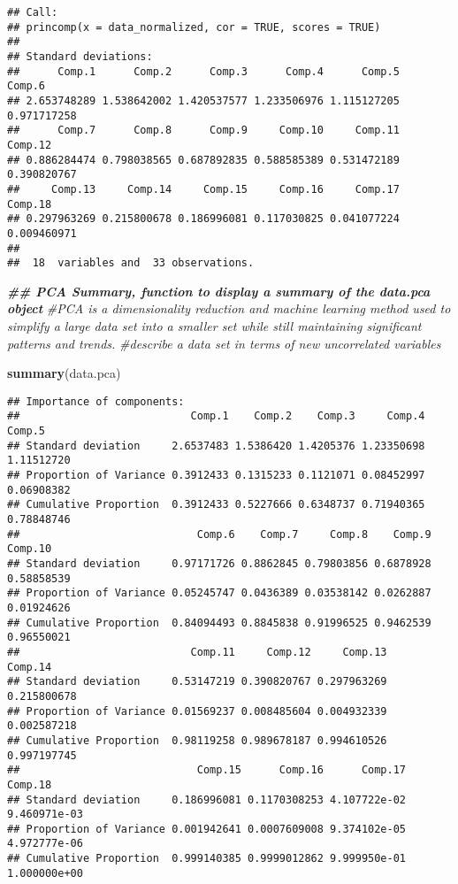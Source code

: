 \documentclass[
]{article}
\newenvironment{Shaded}{\begin{snugshade}}{\end{snugshade}}
\newcommand{\CommentTok}[1]{\textcolor[rgb]{0.56,0.35,0.01}{\textit{#1}}}
\newcommand{\DocumentationTok}[1]{\textcolor[rgb]{0.56,0.35,0.01}{\textbf{\textit{#1}}}}
\newcommand{\FunctionTok}[1]{\textcolor[rgb]{0.13,0.29,0.53}{\textbf{#1}}}
\newcommand{\NormalTok}[1]{#1}
\begin{document}
\begin{verbatim}
## Call:
## princomp(x = data_normalized, cor = TRUE, scores = TRUE)
## 
## Standard deviations:
##      Comp.1      Comp.2      Comp.3      Comp.4      Comp.5      Comp.6 
## 2.653748289 1.538642002 1.420537577 1.233506976 1.115127205 0.971717258 
##      Comp.7      Comp.8      Comp.9     Comp.10     Comp.11     Comp.12 
## 0.886284474 0.798038565 0.687892835 0.588585389 0.531472189 0.390820767 
##     Comp.13     Comp.14     Comp.15     Comp.16     Comp.17     Comp.18 
## 0.297963269 0.215800678 0.186996081 0.117030825 0.041077224 0.009460971 
## 
##  18  variables and  33 observations.
\end{verbatim}

\begin{Shaded}
\begin{Highlighting}[]
\DocumentationTok{\#\# PCA Summary, function to display a summary of the data.pca object}
\CommentTok{\#PCA is a dimensionality reduction and machine learning method used to simplify a large data set into a smaller set while still maintaining significant patterns and trends.}
\CommentTok{\#describe a data set in terms of new uncorrelated variables}

\FunctionTok{summary}\NormalTok{(data.pca)}
\end{Highlighting}
\end{Shaded}

\begin{verbatim}
## Importance of components:
##                           Comp.1    Comp.2    Comp.3     Comp.4     Comp.5
## Standard deviation     2.6537483 1.5386420 1.4205376 1.23350698 1.11512720
## Proportion of Variance 0.3912433 0.1315233 0.1121071 0.08452997 0.06908382
## Cumulative Proportion  0.3912433 0.5227666 0.6348737 0.71940365 0.78848746
##                            Comp.6    Comp.7     Comp.8    Comp.9    Comp.10
## Standard deviation     0.97171726 0.8862845 0.79803856 0.6878928 0.58858539
## Proportion of Variance 0.05245747 0.0436389 0.03538142 0.0262887 0.01924626
## Cumulative Proportion  0.84094493 0.8845838 0.91996525 0.9462539 0.96550021
##                           Comp.11     Comp.12     Comp.13     Comp.14
## Standard deviation     0.53147219 0.390820767 0.297963269 0.215800678
## Proportion of Variance 0.01569237 0.008485604 0.004932339 0.002587218
## Cumulative Proportion  0.98119258 0.989678187 0.994610526 0.997197745
##                            Comp.15      Comp.16      Comp.17      Comp.18
## Standard deviation     0.186996081 0.1170308253 4.107722e-02 9.460971e-03
## Proportion of Variance 0.001942641 0.0007609008 9.374102e-05 4.972777e-06
## Cumulative Proportion  0.999140385 0.9999012862 9.999950e-01 1.000000e+00
\end{verbatim}
\end{document}
